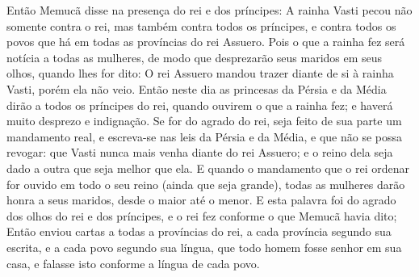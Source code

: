 {Então Memucã disse na presença do rei e dos príncipes: A rainha Vasti pecou não somente contra o rei, mas também contra todos os príncipes, e contra todos os povos que há em todas as províncias do rei Assuero.
Pois o que a rainha fez será notícia a todas as mulheres, de modo que desprezarão seus maridos em seus olhos, quando lhes for dito: O rei Assuero mandou trazer diante de si à rainha Vasti, porém ela não veio.
Então neste dia as princesas da Pérsia e da Média dirão
{} a todos os príncipes do rei, quando ouvirem o que a rainha fez; e
{} haverá muito desprezo e indignação.
Se for do agrado do rei, seja feito de sua parte um mandamento real, e escreva-se nas leis da Pérsia e da Média, e que não se possa revogar: que Vasti nunca mais venha diante do rei Assuero; e o reino dela seja dado a outra que seja melhor que ela.
E quando o mandamento que o rei ordenar for ouvido em todo o seu reino (ainda que seja grande), todas as mulheres darão honra a seus maridos, desde o maior até o menor.
E esta palavra foi do agrado dos olhos do rei e dos príncipes, e o rei fez conforme o que Memucã havia dito;
Então enviou cartas a todas a províncias do rei, a cada província segundo sua escrita, e a cada povo segundo sua língua, que todo homem fosse senhor em sua casa, e falasse isto conforme a língua de cada povo.

}
